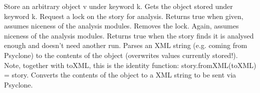 \begin{interface}
    {Store an arbitrary object v under keyword k.}
    {Gets the object stored under keyword k.}
    {Request a lock on the story for analysis. Returns true when given, assumes
      niceness of the analysis modules.}
    {Removes the lock. Again, assumes niceness of the analysis modules.}
    {Returns true when the story finds it is analysed enough and doesn't need
      another run.}
    {Parses an XML string (e.g. coming from Psyclone) to the contents of the
      object (overwrites values currently stored!). Note, together with toXML,
      this is the identity function: story.fromXML(toXML) = story.}
    {Converts the contents of the object to a XML string to be sent via
      Psyclone.}
\end{interface}

